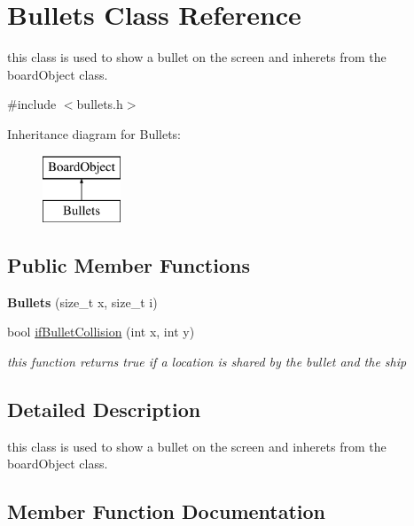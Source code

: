 \hypertarget{class_bullets}{}\section{Bullets Class Reference}
\label{class_bullets}


this class is used to show a bullet on the screen and inherets from the board\+Object class.  




{\ttfamily \#include $<$bullets.\+h$>$}

Inheritance diagram for Bullets\+:\begin{figure}[H]
\begin{center}
\leavevmode
\includegraphics[height=2.000000cm]{class_bullets}
\end{center}
\end{figure}
\subsection*{Public Member Functions}
\begin{DoxyCompactItemize}
\item 
\hypertarget{class_bullets_a053dc2b5ee2434337606ba39f14d56db}{}{\bfseries Bullets} (size\+\_\+t x, size\+\_\+t i)\label{class_bullets_a053dc2b5ee2434337606ba39f14d56db}

\item 
bool \hyperlink{class_bullets_ac3f6f8dfb0caf4021dfefb3b2c650a42}{if\+Bullet\+Collision} (int x, int y)
\begin{DoxyCompactList}\small\item\em this function returns true if a location is shared by the bullet and the ship \end{DoxyCompactList}\end{DoxyCompactItemize}


\subsection{Detailed Description}
this class is used to show a bullet on the screen and inherets from the board\+Object class. 

\subsection{Member Function Documentation}
\hypertarget{class_bullets_ac3f6f8dfb0caf4021dfefb3b2c650a42}{}

